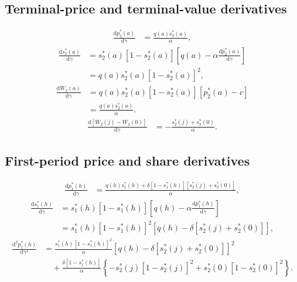 \documentclass[11pt]{article}
\newcommand{\dd}{\mathrm{d}}
\begin{document}
\subsection{Terminal-price and terminal-value derivatives}
\begin{equation}
\begin{aligned}
\frac{\dd p_2^*(a)}{\dd\gamma}
&=\frac{q(a)s_2^*(a)}{\alpha},
\end{aligned}
\end{equation}
\begin{equation}
\begin{aligned}
\frac{\dd s_2^*(a)}{\dd\gamma}
&=s_2^*(a)[1-s_2^*(a)]\left[q(a)-\alpha\frac{\dd p_2^*(a)}{\dd\gamma}\right]\\[3pt]
&=q(a)s_2^*(a)[1-s_2^*(a)]^2,
\end{aligned}
\end{equation}
\begin{equation}
\begin{aligned}
\frac{\dd W_2(a)}{\dd\gamma}
&=q(a)s_2^*(a)[1-s_2^*(a)][p_2^*(a)-c]\\[3pt]
&=\frac{q(a)s_2^*(a)}{\alpha}.
\end{aligned}
\end{equation}
\begin{equation}
\begin{aligned}
\frac{\dd[W_2(j)-W_2(0)]}{\dd\gamma}
&=-\frac{s_2^*(j)+s_2^*(0)}{\alpha}.
\end{aligned}
\end{equation}

\subsection{First-period price and share derivatives}
\begin{equation}
\begin{aligned}
\frac{\dd p_1^*(h)}{\dd\gamma}
&=\frac{q(h)s_1^*(h)+\delta[1-s_1^*(h)][s_2^*(j)+s_2^*(0)]}{\alpha},
\end{aligned}
\end{equation}
\begin{equation}
\begin{aligned}
\frac{\dd s_1^*(h)}{\dd\gamma}
&=s_1^*(h)[1-s_1^*(h)]\left[q(h)-\alpha\frac{\dd p_1^*(h)}{\dd\gamma}\right]\\[3pt]
&=s_1^*(h)[1-s_1^*(h)]^2\left[q(h)-\delta[s_2^*(j)+s_2^*(0)]\right],
\end{aligned}
\end{equation}
\begin{equation}
\begin{aligned}
\frac{\dd^2p_1^*(h)}{\dd\gamma^2}
&=\frac{s_1^*(h)[1-s_1^*(h)]^2}{\alpha}
 \left[q(h)-\delta[s_2^*(j)+s_2^*(0)]\right]^2\\[3pt]
&\quad+\frac{\delta[1-s_1^*(h)]}{\alpha}
 \left\{-s_2^*(j)[1-s_2^*(j)]^2+s_2^*(0)[1-s_2^*(0)]^2\right\}.
\end{aligned}
\end{equation}
\end{document}
